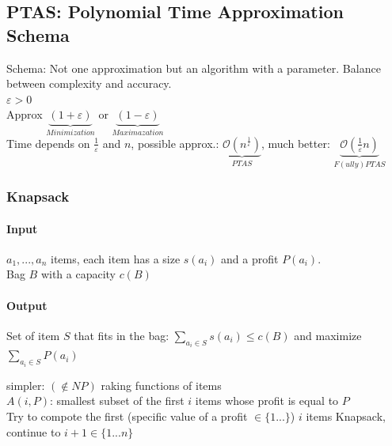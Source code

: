 \subsection{PTAS: Polynomial Time Approximation Schema}
Schema: Not one approximation but an algorithm with a parameter. Balance between complexity and accuracy. \\
$\varepsilon > 0$ \\
Approx $\underbrace{(1 + \varepsilon)}_{Minimization}$ or $\underbrace{(1- \varepsilon)}_{Maximazation}$ \\
Time depends on $\frac{1}{\varepsilon}$ and $n$, possible approx.: $\underbrace{\mathcal{O}(n^{\frac{1}{\varepsilon}})}_{PTAS}$, much better: $\underbrace{\mathcal{O}(\frac{1}{\varepsilon}n)}_{F(ully)PTAS}$ 
\subsubsection{Knapsack}
\paragraph{Input}
$a_1,...,a_n$ items, each item has a size $s(a_i)$ and a profit $P(a_i)$. \\
Bag $B$ with a capacity $c(B)$
\paragraph{Output} Set of item $S$ that fits in the bag: 
$\sum_{a_i\in S}s(a_i) \leq c(B)$ and
maximize $\sum_{a_i \in S}P(a_i)$

simpler: $(\notin NP)$ raking functions of items \\
$A(i,P)$: smallest subset of the first $i$ items whose profit is equal to $P$ \\
Try to compote the first (specific value of a profit $\in \{1...\}$) $i$ items Knapsack, continue to $i+1 \in \{1...n\}$

